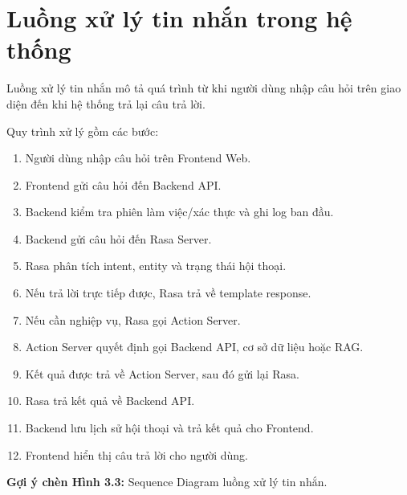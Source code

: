 ﻿\section{Luồng xử lý tin nhắn trong hệ thống}

Luồng xử lý tin nhắn mô tả quá trình từ khi người dùng nhập câu hỏi trên giao diện đến khi hệ thống trả lại câu trả lời.

Quy trình xử lý gồm các bước:
\begin{enumerate}
    \item Người dùng nhập câu hỏi trên Frontend Web.
    \item Frontend gửi câu hỏi đến Backend API.
    \item Backend kiểm tra phiên làm việc/xác thực và ghi log ban đầu.
    \item Backend gửi câu hỏi đến Rasa Server.
    \item Rasa phân tích intent, entity và trạng thái hội thoại.
    \item Nếu trả lời trực tiếp được, Rasa trả về template response.
    \item Nếu cần nghiệp vụ, Rasa gọi Action Server.
    \item Action Server quyết định gọi Backend API, cơ sở dữ liệu hoặc RAG.
    \item Kết quả được trả về Action Server, sau đó gửi lại Rasa.
    \item Rasa trả kết quả về Backend API.
    \item Backend lưu lịch sử hội thoại và trả kết quả cho Frontend.
    \item Frontend hiển thị câu trả lời cho người dùng.
\end{enumerate}

\textbf{Gợi ý chèn Hình 3.3:} Sequence Diagram luồng xử lý tin nhắn.
